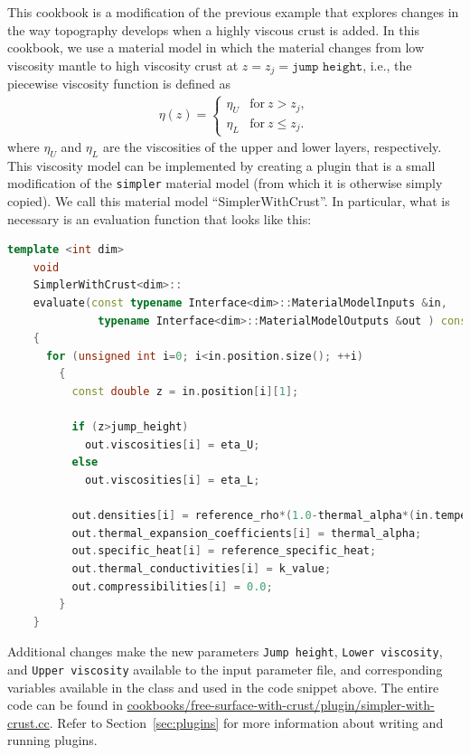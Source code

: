 \documentclass{article}
\begin{document}
This cookbook is a modification of the previous example that explores changes in the way topography develops when a 
highly viscous crust is added.  
In this cookbook, we use a material model in which the material changes from low
viscosity mantle to high viscosity crust at $z = z_j = \texttt{jump height}$,
i.e., the piecewise viscosity function is defined as
\begin{align*}
  \eta(z) = \left\{
    \begin{matrix}
      \eta_U & \text{for}\ z > z_j, \\
      \eta_L & \text{for}\ z  \le z_j.
    \end{matrix}
  \right.
\end{align*}
where $\eta_U$ and $\eta_L$ are the viscosities of the upper and lower layers,
respectively. This viscosity model can be implemented by creating a plugin that
is a small modification of the \texttt{simpler} material model (from which it
is otherwise simply copied). We call this material model ``SimplerWithCrust''.
In particular, what is necessary is an evaluation function that looks like this:
\begin{lstlisting}[frame=single,language=C++] 
    template <int dim>
    void
    SimplerWithCrust<dim>::
    evaluate(const typename Interface<dim>::MaterialModelInputs &in, 
              typename Interface<dim>::MaterialModelOutputs &out ) const
    {
      for (unsigned int i=0; i<in.position.size(); ++i)
        { 
          const double z = in.position[i][1];

          if (z>jump_height)
            out.viscosities[i] = eta_U;
          else
            out.viscosities[i] = eta_L;
                     
          out.densities[i] = reference_rho*(1.0-thermal_alpha*(in.temperature[i]-reference_T));
          out.thermal_expansion_coefficients[i] = thermal_alpha;
          out.specific_heat[i] = reference_specific_heat;
          out.thermal_conductivities[i] = k_value;
          out.compressibilities[i] = 0.0;
        }
    }
\end{lstlisting}
Additional changes make the new parameters \texttt{Jump height}, \texttt{Lower
viscosity}, and \texttt{Upper viscosity} available to the input parameter file,
and corresponding variables available in the class and used in the code snippet
above. The entire code can be found in
\url{cookbooks/free-surface-with-crust/plugin/simpler-with-crust.cc}. Refer to
Section~\ref{sec:plugins} for more information about writing and running
plugins.
\end{document}
